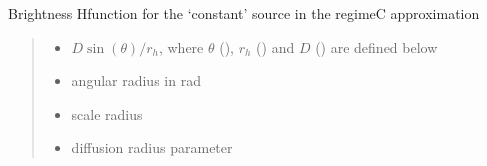 \documentclass[letterpaper,10pt,english]{sphinxmanual}
\begin{document}

\begin{fulllineitems}
\label{\detokenize{diffsph.profiles:diffsph.profiles.analytics.cobrC}}
\pysigstartsignatures
{}
\pysigstopsignatures
\sphinxAtStartPar
Brightness H\sphinxhyphen{}function for the ‘constant’ source in the regime\sphinxhyphen{}C approximation
\begin{quote}\begin{description}
\begin{itemize}
\item {} 
\sphinxAtStartPar
{} \textendash{} \(D\sin(\theta)/r_h\), where \(\theta\) (), \(r_h\) () and \(D\) () are defined below

\item {} 
\sphinxAtStartPar
{} \textendash{} angular radius in rad

\item {} 
\sphinxAtStartPar
{} \textendash{} scale radius

\item {} 
\sphinxAtStartPar
{} \textendash{} diffusion radius parameter

\end{itemize}

\end{description}\end{quote}

\end{fulllineitems}

\end{document}
